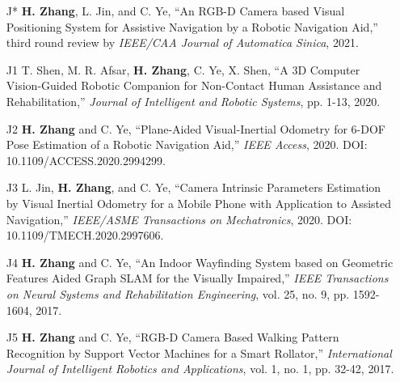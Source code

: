 

\begin{justify}
	\begin{itemize}[before=\fontsize{9pt}{1em}\bodyfontlight\upshape\color{text},leftmargin=3ex, nosep, noitemsep]
		\setlength{\parskip}{0pt}
		\renewcommand{\labelitemi}{\bullet}
		\item[J*]{\textbf{H. Zhang}, L. Jin, and C. Ye, “An RGB-D Camera based Visual Positioning System for Assistive Navigation by a Robotic Navigation Aid,” third round review by \emph{IEEE/CAA Journal of Automatica Sinica}, 2021.}
		\item[J1]{T. Shen, M. R. Afsar, \textbf{H. Zhang}, C. Ye, X. Shen, “A 3D Computer Vision-Guided Robotic Companion for Non-Contact Human Assistance and Rehabilitation,” \emph{Journal of Intelligent and Robotic Systems}, pp. 1-13, 2020.}
		\item[J2]{\textbf{H. Zhang} and C. Ye, “Plane-Aided Visual-Inertial Odometry for 6-DOF Pose Estimation of a Robotic Navigation Aid,” \emph{IEEE Access}, 2020. DOI: 10.1109/ACCESS.2020.2994299.}
		\item[J3]{L. Jin, \textbf{H. Zhang}, and C. Ye, “Camera Intrinsic Parameters Estimation by Visual Inertial Odometry for a Mobile Phone with Application to Assisted Navigation,” \emph{IEEE/ASME Transactions on Mechatronics}, 2020. DOI: 10.1109/TMECH.2020.2997606.}
		\item[J4]{\textbf{H. Zhang} and C. Ye, “An Indoor Wayfinding System based on Geometric Features Aided Graph SLAM for the Visually Impaired,” \emph{IEEE Transactions on Neural Systems and Rehabilitation Engineering}, vol. 25, no. 9, pp. 1592-1604, 2017.}
		\item[J5]{\textbf{H. Zhang} and C. Ye, “RGB-D Camera Based Walking Pattern Recognition by Support Vector Machines for a Smart Rollator,” \emph{International Journal of Intelligent Robotics and Applications}, vol. 1, no. 1, pp. 32-42, 2017.}
	\end{itemize}
\end{justify}


